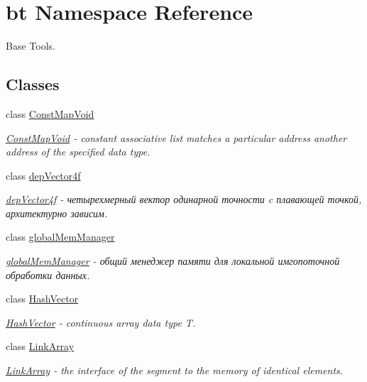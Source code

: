\hypertarget{namespacebt}{\section{bt Namespace Reference}
\label{namespacebt}
}


Base Tools.  


\subsection*{Classes}
\begin{DoxyCompactItemize}
\item 
class \hyperlink{classbt_1_1_const_map_void}{Const\-Map\-Void}
\begin{DoxyCompactList}\small\item\em \hyperlink{classbt_1_1_const_map_void}{Const\-Map\-Void} -\/ constant associative list matches a particular address another address of the specified data type. \end{DoxyCompactList}\item 
class \hyperlink{classbt_1_1dep_vector4f}{dep\-Vector4f}
\begin{DoxyCompactList}\small\item\em \hyperlink{classbt_1_1dep_vector4f}{dep\-Vector4f} -\/ четырехмерный вектор одинарной точности c плавающей точкой, архитектурно зависим. \end{DoxyCompactList}\item 
class \hyperlink{classbt_1_1global_mem_manager}{global\-Mem\-Manager}
\begin{DoxyCompactList}\small\item\em \hyperlink{classbt_1_1global_mem_manager}{global\-Mem\-Manager} -\/ общий менеджер памяти для локальной имгопоточной обработки данных. \end{DoxyCompactList}\item 
class \hyperlink{classbt_1_1_hash_vector}{Hash\-Vector}
\begin{DoxyCompactList}\small\item\em \hyperlink{classbt_1_1_hash_vector}{Hash\-Vector} -\/ continuous array data type T. \end{DoxyCompactList}\item 
class \hyperlink{classbt_1_1_link_array}{Link\-Array}
\begin{DoxyCompactList}\small\item\em \hyperlink{classbt_1_1_link_array}{Link\-Array} -\/ the interface of the segment to the memory of identical elements. \end{DoxyCompactList}\item 

\end{DoxyCompactItemize}
